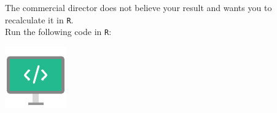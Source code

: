 \begin{minipage}{0.8\textwidth}
The commercial director does not believe your result and wants you to recalculate it in \texttt{R}. \\

Run the following code in \texttt{R}: \\
\end{minipage}%
\hfill%
\begin{minipage}{0.1\textwidth}
\includegraphics[width=\linewidth]{Files/Images/displaycode.pdf}
\end{minipage}
\vspace*{.1cm}



\twolineanswerbox

\clearpage %